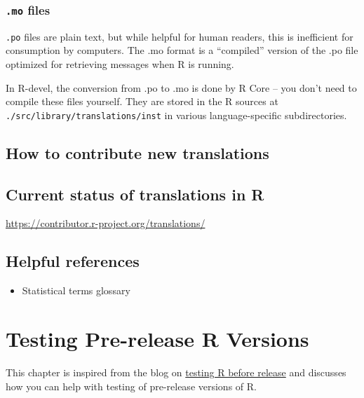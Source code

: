 \documentclass[
]{book}
\providecommand{\tightlist}{%
  \setlength{\itemsep}{0pt}\setlength{\parskip}{0pt}}
\begin{document}
\hypertarget{mo-files}{%
\subsection{\texorpdfstring{\texttt{.mo} files}{.mo files}}\label{mo-files}}

\texttt{.po} files are plain text, but while helpful for human readers, this is inefficient for consumption by computers.
The .mo format is a ``compiled'' version of the .po file optimized for retrieving messages when R is running.

In R-devel, the conversion from .po to .mo is done by R Core -- you don't need to compile these files yourself.
They are stored in the R sources at \texttt{./src/library/translations/inst} in various language-specific subdirectories.

\hypertarget{how-to-contribute-new-translations}{%
\section{How to contribute new translations}\label{how-to-contribute-new-translations}}

\hypertarget{current-status-of-translations-in-r}{%
\section{Current status of translations in R}\label{current-status-of-translations-in-r}}

\url{https://contributor.r-project.org/translations/}

\hypertarget{helpful-references}{%
\section{Helpful references}\label{helpful-references}}

\begin{itemize}
\tightlist
\item
  Statistical terms glossary
\end{itemize}

\hypertarget{TestRVer}{%
\chapter{Testing Pre-release R Versions}\label{TestRVer}}

This chapter is inspired from the blog on \href{https://developer.r-project.org/Blog/public/2021/04/28/r-can-use-your-help-testing-r-before-release/index.html}{testing R before release} and discusses how you can help with testing of pre-release versions of R.
\end{document}
